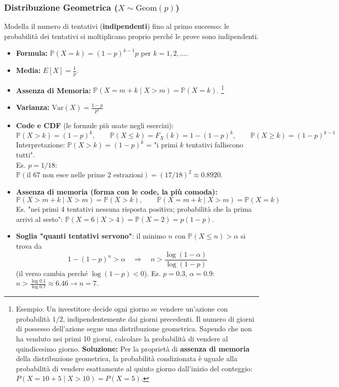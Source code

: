 \documentclass[12pt]{extarticle} %
\begin{document}
\subsubsection{Distribuzione Geometrica ($X \sim \text{Geom}(p)$)}
Modella il numero di tentativi (\textbf{indipendenti}) fino al primo successo: le probabilità dei tentativi si moltiplicano proprio perché le prove sono indipendenti.
\begin{itemize}
    \item \textbf{Formula:} $\mathbb{P}(X=k) = (1-p)^{k-1}p$ per $k=1, 2, \dots$.
    \item \textbf{Media:} $E[X] = \frac{1}{p}$.
    \item \textbf{Assenza di Memoria:} $\mathbb{P}(X = m+k \mid X > m) = \mathbb{P}(X = k)$. \footnote{Esempio: Un investitore decide ogni giorno se vendere un'azione con probabilità $1/2$, indipendentemente dai giorni precedenti. Il numero di giorni di possesso dell'azione segue una distribuzione geometrica. Sapendo che non ha venduto nei primi 10 giorni, calcolare la probabilità di vendere al quindicesimo giorno. \textbf{Soluzione:} Per la proprietà di \textbf{assenza di memoria} della distribuzione geometrica, la probabilità condizionata è uguale alla probabilità di vendere esattamente al quinto giorno dall'inizio del conteggio: $P(X = 10+5 \mid X > 10) = P(X = 5)$.}
    \item \textbf{Varianza:} $\text{Var}(X) = \frac{1-p}{p^2}$
    \item \textbf{Code e CDF} (le formule più usate negli esercizi):
    $$ \mathbb{P}(X > k) = (1-p)^k, \qquad \mathbb{P}(X \le k) = F_X(k) = 1 - (1-p)^k, \qquad \mathbb{P}(X \ge k) = (1-p)^{k-1} $$
    {\footnotesize Interpretazione: $\mathbb{P}(X > k) = (1-p)^k$ = "i primi $k$ tentativi falliscono tutti". \\ Es. $p = 1/18$: $\mathbb{P}(\text{il 67 non esce nelle prime 2 estrazioni}) = (17/18)^2 \approx 0.8920$.}
    \item \textbf{Assenza di memoria (forma con le code, la più comoda):}
    $$ \mathbb{P}(X > m+k \mid X > m) = \mathbb{P}(X > k), \qquad \mathbb{P}(X = m+k \mid X > m) = \mathbb{P}(X = k) $$
    {\footnotesize Es. "nei primi 4 tentativi nessuna risposta positiva; probabilità che la prima arrivi al sesto": $\mathbb{P}(X=6 \mid X>4) = \mathbb{P}(X=2) = p(1-p)$.}
    \item \textbf{Soglia "quanti tentativi servono"}: il minimo $n$ con $\mathbb{P}(X \le n) > \alpha$ si trova da
    $$ 1-(1-p)^n > \alpha \quad \Longrightarrow \quad n > \frac{\log(1-\alpha)}{\log(1-p)} $$
    {\footnotesize (il verso cambia perché $\log(1-p) < 0$). Es. $p=0.3$, $\alpha = 0.9$: $n > \frac{\log 0.1}{\log 0.7} \approx 6.46 \to n = 7$.}
\end{itemize}
\end{document}
